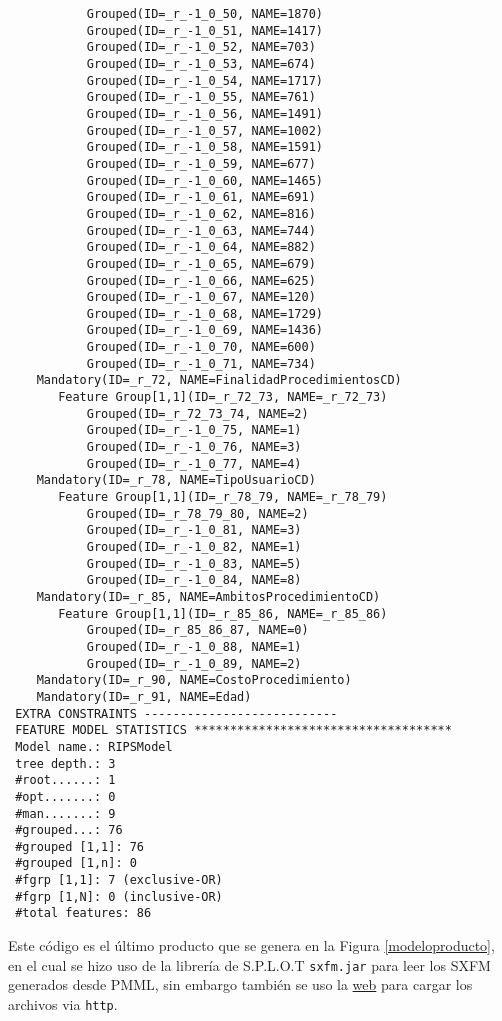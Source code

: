 \begin{lstlisting}
           Grouped(ID=_r_-1_0_50, NAME=1870)
           Grouped(ID=_r_-1_0_51, NAME=1417)
           Grouped(ID=_r_-1_0_52, NAME=703)
           Grouped(ID=_r_-1_0_53, NAME=674)
           Grouped(ID=_r_-1_0_54, NAME=1717)
           Grouped(ID=_r_-1_0_55, NAME=761)
           Grouped(ID=_r_-1_0_56, NAME=1491)
           Grouped(ID=_r_-1_0_57, NAME=1002)
           Grouped(ID=_r_-1_0_58, NAME=1591)
           Grouped(ID=_r_-1_0_59, NAME=677)
           Grouped(ID=_r_-1_0_60, NAME=1465)
           Grouped(ID=_r_-1_0_61, NAME=691)
           Grouped(ID=_r_-1_0_62, NAME=816)
           Grouped(ID=_r_-1_0_63, NAME=744)
           Grouped(ID=_r_-1_0_64, NAME=882)
           Grouped(ID=_r_-1_0_65, NAME=679)
           Grouped(ID=_r_-1_0_66, NAME=625)
           Grouped(ID=_r_-1_0_67, NAME=120)
           Grouped(ID=_r_-1_0_68, NAME=1729)
           Grouped(ID=_r_-1_0_69, NAME=1436)
           Grouped(ID=_r_-1_0_70, NAME=600)
           Grouped(ID=_r_-1_0_71, NAME=734)
    Mandatory(ID=_r_72, NAME=FinalidadProcedimientosCD)
       Feature Group[1,1](ID=_r_72_73, NAME=_r_72_73)
           Grouped(ID=_r_72_73_74, NAME=2)
           Grouped(ID=_r_-1_0_75, NAME=1)
           Grouped(ID=_r_-1_0_76, NAME=3)
           Grouped(ID=_r_-1_0_77, NAME=4)
    Mandatory(ID=_r_78, NAME=TipoUsuarioCD)
       Feature Group[1,1](ID=_r_78_79, NAME=_r_78_79)
           Grouped(ID=_r_78_79_80, NAME=2)
           Grouped(ID=_r_-1_0_81, NAME=3)
           Grouped(ID=_r_-1_0_82, NAME=1)
           Grouped(ID=_r_-1_0_83, NAME=5)
           Grouped(ID=_r_-1_0_84, NAME=8)
    Mandatory(ID=_r_85, NAME=AmbitosProcedimientoCD)
       Feature Group[1,1](ID=_r_85_86, NAME=_r_85_86)
           Grouped(ID=_r_85_86_87, NAME=0)
           Grouped(ID=_r_-1_0_88, NAME=1)
           Grouped(ID=_r_-1_0_89, NAME=2)
    Mandatory(ID=_r_90, NAME=CostoProcedimiento)
    Mandatory(ID=_r_91, NAME=Edad)
 EXTRA CONSTRAINTS ---------------------------
 FEATURE MODEL STATISTICS ************************************
 Model name.: RIPSModel
 tree depth.: 3
 #root......: 1
 #opt.......: 0
 #man.......: 9
 #grouped...: 76
 #grouped [1,1]: 76
 #grouped [1,n]: 0
 #fgrp [1,1]: 7 (exclusive-OR)
 #fgrp [1,N]: 0 (inclusive-OR)
 #total features: 86
 \end{lstlisting}
 
 Este código es el último producto que se genera en la Figura \ref{modeloproducto}, en el cual se hizo uso de la librería de S.P.L.O.T\cite{Mendonca:2009:SSP:1639950.1640002} \texttt{sxfm.jar} para leer los SXFM generados desde PMML, sin embargo también se uso la \href{http://ec2-52-32-1-180.us-west-2.compute.amazonaws.com:8080/SPLOT/index.html}{web} para cargar los archivos via \texttt{http}.
